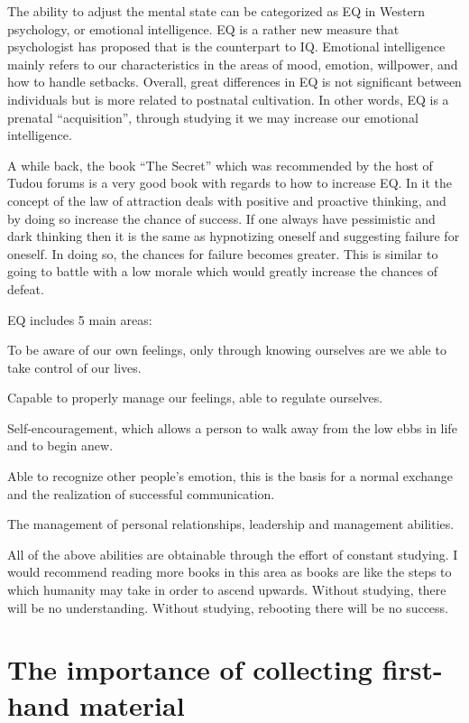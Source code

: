\documentclass[
]{book}
\begin{document}
The ability to adjust the mental state can be categorized as EQ in Western psychology, or emotional intelligence. EQ is a rather new measure that psychologist has proposed that is the counterpart to IQ. Emotional intelligence mainly refers to our characteristics in the areas of mood, emotion, willpower, and how to handle setbacks. Overall, great differences in EQ is not significant between individuals but is more related to postnatal cultivation. In other words, EQ is a prenatal ``acquisition'', through studying it we may increase our emotional intelligence.

A while back, the book ``The Secret'' which was recommended by the host of Tudou forums is a very good book with regards to how to increase EQ. In it the concept of the law of attraction deals with positive and proactive thinking, and by doing so increase the chance of success. If one always have pessimistic and dark thinking then it is the same as hypnotizing oneself and suggesting failure for oneself. In doing so, the chances for failure becomes greater. This is similar to going to battle with a low morale which would greatly increase the chances of defeat.

EQ includes 5 main areas:

To be aware of our own feelings, only through knowing ourselves are we able to take control of our lives.

Capable to properly manage our feelings, able to regulate ourselves.

Self-encouragement, which allows a person to walk away from the low ebbs in life and to begin anew.

Able to recognize other people's emotion, this is the basis for a normal exchange and the realization of successful communication.

The management of personal relationships, leadership and management abilities.

All of the above abilities are obtainable through the effort of constant studying. I would recommend reading more books in this area as books are like the steps to which humanity may take in order to ascend upwards. Without studying, there will be no understanding. Without studying, rebooting there will be no success.

\hypertarget{the-importance-of-collecting-first-hand-material}{%
\section{The importance of collecting first-hand material}\label{the-importance-of-collecting-first-hand-material}}
\end{document}
